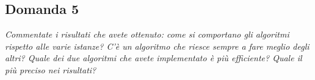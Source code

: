 \subsection{Domanda 5}
\textit{Commentate i risultati che avete ottenuto: come si comportano gli algoritmi rispetto alle varie istanze? C'è un algoritmo che riesce sempre a fare meglio degli altri? Quale dei due algoritmi che avete implementato è più efficiente? Quale il più preciso nei risultati?}
